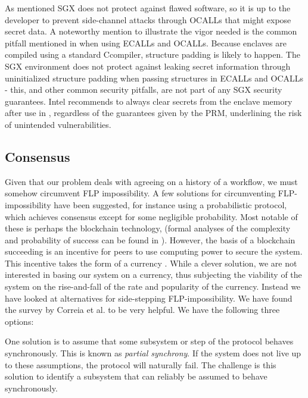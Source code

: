 \documentclass[12pt]{article}
\newcommand\cpp{C\nolinebreak[4]\hspace{-.05em}\raisebox{.4ex}{\relsize{-3}{\textbf{++}}}}
\begin{document}
	    As mentioned SGX does not protect against flawed software, so it is up to the developer to prevent side-channel attacks through OCALLs that might expose secret data.
	    A noteworthy mention to illustrate the vigor needed is the common pitfall mentioned in \cite{sgx-dev-guide} when using ECALLs and OCALLs.
	    Because enclaves are compiled using a standard \cpp compiler, structure padding is likely to happen.
	    The SGX environment does not protect against leaking secret information through uninitialized structure padding when passing structures in ECALLs and OCALLs - this, and other common security pitfalls, are not part of any SGX security guarantees.
	    Intel recommends to always clear secrets from the enclave memory after use in \cite{sgx-dev-guide}, regardless of the guarantees given by the PRM, underlining the risk of unintended vulnerabilities.

		\subsection{Consensus}
		Given that our problem deals with agreeing on a history of a workflow, we must somehow circumvent FLP impossibility.
		A few solutions for circumventing FLP-impossibility have been suggested, for instance using a probabilistic protocol, which achieves consensus except for some negligible probability.
		Most notable of these is perhaps the blockchain technology, (formal analyses of the complexity and probability of success can be found in \cite{miller2014anonymous}).
		However, the basis of a blockchain succeeding is an incentive for peers to use computing power to secure the system.
		This incentive takes the form of a currency \cite{bitcoin-white-paper}.
		While a clever solution, we are not interested in basing our system on a currency, thus subjecting the viability of the system on the rise-and-fall of the rate and popularity of the currency. 
		Instead we have looked at alternatives for side-stepping FLP-impossibility. 
		We have found the survey by Correia et al. \cite{consensus-survey} to be very helpful. 
		We have the following three options:

		One solution is to assume that some subsystem or step of the protocol behaves synchronously. 
		This is known as \textit{partial synchrony}. 
		If the system does not live up to these assumptions, the protocol will naturally fail. 
		The challenge is this solution to identify a subsystem that can reliably be assumed to behave synchronously. 
\end{document}
